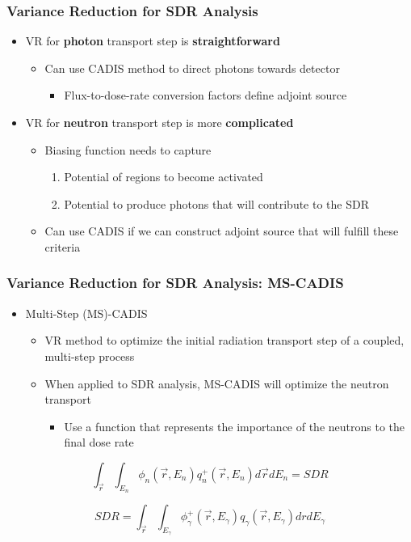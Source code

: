 \documentclass{beamer}
\begin{document}
\begin{frame}
\frametitle{Variance Reduction for SDR Analysis}
\begin{itemize}
	\item{VR for \textbf{photon} transport step is \textbf{straightforward}}
  \begin{itemize}
  \item{Can use CADIS method to direct photons towards detector}
    \begin{itemize}
    \item{Flux-to-dose-rate conversion factors define adjoint source}
    \end{itemize}
  \end{itemize}
\item{VR for \textbf{neutron} transport step is more \textbf{complicated}}
    \begin{itemize}
    \item{Biasing function needs to capture}
      \begin{enumerate}
        \item{Potential of regions to become activated}
        \item{Potential to produce photons that will contribute to the SDR}
      \end{enumerate}
    \item{Can use CADIS if we can construct adjoint source that will fulfill
	    these criteria}
    \end{itemize}
\end{itemize}
\end{frame}


\begin{frame}
\frametitle{Variance Reduction for SDR Analysis: MS-CADIS}
\begin{itemize}
\item{Multi-Step (MS)-CADIS}
  \begin{itemize}
  \item {VR method to optimize the initial radiation transport step of a coupled, multi-step process}
  \item{When applied to SDR analysis, MS-CADIS will optimize the neutron transport}
    \begin{itemize}
    \item{Use a function that represents the   importance of the neutrons to
	    the final dose rate}
    \end{itemize}
  \end{itemize}
\end{itemize}
 \centering
	\begin{equation}
	\int_{\overrightarrow{r}} \int_{E_n} \phi_n(\overrightarrow{r}, E_n)
	q_n^+(\overrightarrow{r}, E_n) d\overrightarrow{r} dE_n = SDR
	\end{equation}

 \centering
	\begin{equation}
		SDR = \int_{\overrightarrow{r}} \int_{E_{\gamma}} 
		\phi_{\gamma}^+(\overrightarrow{r}, E_{\gamma})
		q_{\gamma}(\overrightarrow{r}, E_{\gamma})
		dr dE_{\gamma} 
	\end{equation}
\end{frame}
\end{document}
